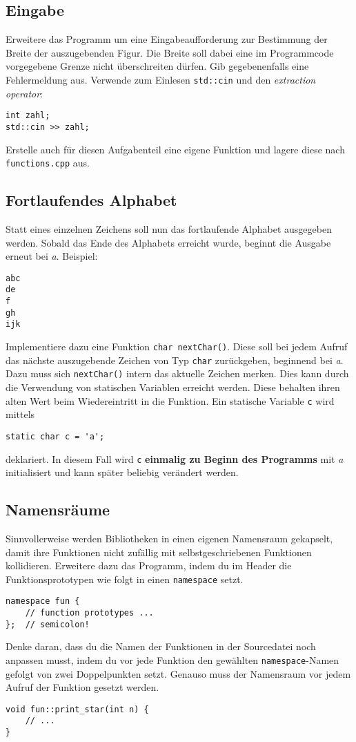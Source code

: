 \subsection{Eingabe}
Erweitere das Programm um eine Eingabeaufforderung zur Bestimmung der Breite der auszugebenden Figur.
Die Breite soll dabei eine im Programmcode vorgegebene Grenze nicht überschreiten dürfen.
Gib gegebenenfalls eine Fehlermeldung aus.
Verwende zum Einlesen \texttt{std::cin} und den \emph{extraction operator}:
\begin{lstlisting}
int zahl;
std::cin >> zahl;
\end{lstlisting}
Erstelle auch für diesen Aufgabenteil eine eigene Funktion und lagere diese nach \texttt{functions.cpp} aus.

\subsection{Fortlaufendes Alphabet}
Statt eines einzelnen Zeichens soll nun das fortlaufende Alphabet ausgegeben werden.
Sobald das Ende des Alphabets erreicht wurde, beginnt die Ausgabe erneut bei \emph{a}.
Beispiel:
\begin{lstlisting}
abc
de
f
gh
ijk
\end{lstlisting}

Implementiere dazu eine Funktion \texttt{char nextChar()}.
Diese soll bei jedem Aufruf das nächste auszugebende Zeichen von Typ \texttt{char} zurückgeben, beginnend bei \emph{a}.
Dazu muss sich \texttt{nextChar()} intern das aktuelle Zeichen merken.
Dies kann durch die Verwendung von statischen Variablen erreicht werden. Diese behalten ihren alten Wert beim Wiedereintritt in die Funktion.
Ein statische Variable \texttt{c} wird mittels
\begin{lstlisting}
static char c = 'a';
\end{lstlisting}
deklariert.
In diesem Fall wird \texttt{c} \textbf{einmalig zu Beginn des Programms} mit \emph{a} initialisiert und kann später beliebig verändert werden.

\subsection{Namensräume}
Sinnvollerweise werden Bibliotheken in einen eigenen Namensraum gekapselt, damit ihre Funktionen nicht zufällig mit selbstgeschriebenen Funktionen kollidieren.
Erweitere dazu das Programm, indem du im Header die Funktionsprototypen wie folgt in einen \texttt{namespace} setzt.
\begin{lstlisting}
namespace fun {
	// function prototypes ...
};	// semicolon!
\end{lstlisting}
Denke daran, dass du die Namen der Funktionen in der Sourcedatei noch anpassen musst, indem du vor jede Funktion den gewählten \texttt{namespace}-Namen gefolgt von zwei Doppelpunkten setzt. Genauso muss der Namensraum vor jedem Aufruf der Funktion gesetzt werden.
\begin{lstlisting}
void fun::print_star(int n) {
	// ...
}
\end{lstlisting}

